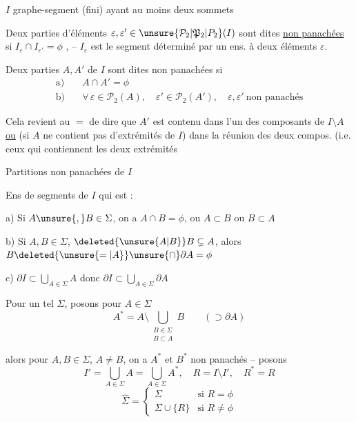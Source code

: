 $I$ graphe-segment (fini) ayant au moins deux sommets

Deux parties d'éléments $\varepsilon,\varepsilon'\in\unsure{\mathcal{P}_2|\mathfrak{P}_2|P_2}(I)$ sont dites \uline{non panachées} si  $I_{\varepsilon}\cap I_{\varepsilon'}=\phi$ , -- $I_{\varepsilon}$ est le segment déterminé par un ens. à deux éléments $\varepsilon$.

Deux parties $A,A'$ de $I$ sont dites non panachées si
\[
\begin{aligned}
\text{a)}\quad &A\cap A'=\phi\\
\text{b)}\quad &\forall\,\varepsilon\in\mathcal{P}_2(A),\quad \varepsilon'\in\mathcal{P}_2(A'),\quad \varepsilon,\varepsilon'\ \text{non panachés}
\end{aligned}
\]

\reversemarginpar{}
Cela revient au $=$ de dire que $A'$ est contenu dans l'un des  composants de $I\setminus A$ \uline{ou} (si $A$ ne contient pas d'extrémités de $I$) dans la réunion des deux compos.   (i.e. ceux qui contiennent les deux extrémités

\normalmarginpar

Partitions non panachées de $I$

Ens \inserted{$\Sigma$} de segments de $I$ qui est :

a) Si $A\unsure{,}B\in\Sigma$, on a $A\cap B=\phi$, ou $A\subset B$ ou $B\subset A$

b) Si $A,B\in\Sigma$, $\deleted{\unsure{A|B}}B\subsetneq A$, alors $B\deleted{\unsure{=|A}}\unsure{\cap}\partial A=\phi$

c) \deleted{\unsure{$\forall$|$\forall\varepsilon$}} $\partial I\subset\bigcup\limits_{A\in\Sigma} A$ donc $\partial I\subset\bigcup\limits_{A\in\Sigma}\partial A$

Pour un tel $\Sigma$, posons pour $A\in\Sigma$
\[
A^{\ast}=A\setminus\bigcup_{\substack{B\in\Sigma\\B\subset A}} B \qquad (\supset\partial A)
\]

alors  pour $A,B\in\Sigma$, $A\ne B$, on a $A^{\ast}$ et $B^{\ast}$ non panachés -- posons   
\[
I'=\bigcup_{A\in\Sigma}A=\bigcup_{A\in\Sigma} A^{\ast},\quad R=I\setminus I',\quad R^{\ast}=R
\]
\[
\hat{\Sigma}=\begin{cases}
\Sigma &\text{si }R=\phi\\
\Sigma\cup\{R\} &\text{si }R\ne\phi
\end{cases}
\]
